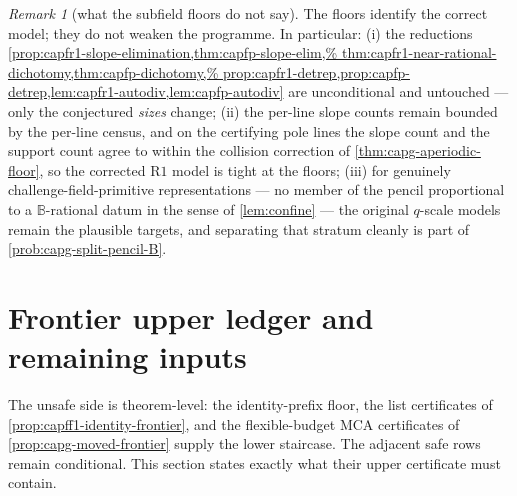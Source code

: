 \documentclass[11pt]{article}
\theoremstyle{definition}
\theoremstyle{remark}
\newtheorem{remark}[remark]{Remark}
\newcommand{\B}{\mathbb{B}}
\providecommand{\Rone}{\mathrm{R1}}
\begin{document}
\begin{remark}[what the subfield floors do not say]
\label{rem:capg-subfield-scope}
The floors identify the correct model; they do not weaken the programme.
In particular: \textup{(i)} the reductions
\cref{prop:capfr1-slope-elimination,thm:capfp-slope-elim,%
thm:capfr1-near-rational-dichotomy,thm:capfp-dichotomy,%
prop:capfr1-detrep,prop:capfp-detrep,lem:capfr1-autodiv,lem:capfp-autodiv}
are unconditional and untouched --- only the conjectured \emph{sizes}
change; \textup{(ii)} the per-line slope counts remain bounded by the
per-line census, and on the certifying pole lines the slope count and
the support count agree to within the collision correction of
\cref{thm:capg-aperiodic-floor}, so the corrected $\Rone$ model is tight
at the floors; \textup{(iii)} for genuinely challenge-field-primitive
representations --- no member of the pencil proportional to a
$\B$-rational datum in the sense of \cref{lem:confine} --- the original
$q$-scale models remain the plausible targets, and separating that
stratum cleanly is part of \cref{prob:capg-split-pencil-B}.
\end{remark}

\section{Frontier upper ledger and remaining inputs}\label{sec:frontier-next-steps}

The unsafe side is theorem-level: the identity-prefix floor, the list certificates of \cref{prop:capff1-identity-frontier}, and the flexible-budget MCA certificates of \cref{prop:capg-moved-frontier} supply the lower staircase.  The adjacent safe rows remain conditional.  This section states exactly what their upper certificate must contain.
\end{document}
